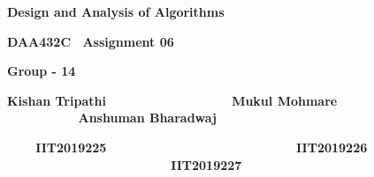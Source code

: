 \documentclass[letterpaper]{article}
\title{}
\author{}
\date{2021-04-04}
\begin{document}
\clearpage\setcounter{page}{1}\pagestyle{Standard}
{\centering
\textbf{Design and Analysis of Algorithms \ }
\par}

{\centering
\textbf{DAA432C \ Assignment 06 \ }
\par}

{\centering\bfseries
Group - 14
\par}


\bigskip

{\bfseries
Kishan Tripathi \ \ \ \ \ \ \ \ \ \ \ \ \ \ \ \ \ Mukul Mohmare \ \ \ \ \ \ \ \ \ \ Anshuman Bharadwaj}

\textbf{\ \ \ \ IIT2019225 \ \ \ \ \ \ \ \ \ \ \ \ \ \ \ \ \ \ \ \ \ \ \ \ \ \ IIT2019226
\ \ \ \ \ \ \ \ \ \ \ \ \ \ \ \ \ \ \ \ \ \ \ IIT2019227}


\bigskip
\end{document}
